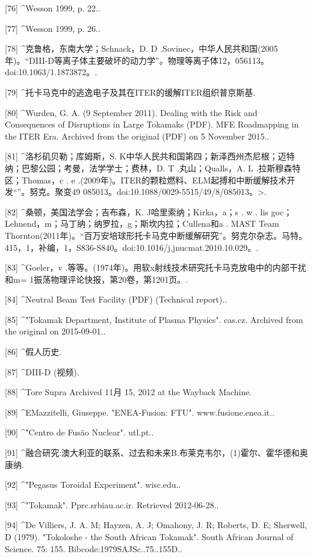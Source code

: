 [76]
^Wesson 1999, p. 22..

[77]
^Wesson 1999, p. 26..

[78]
^克鲁格，东南大学；Schnack，D. D .Sovinec，中华人民共和国(2005年)。“DIII-D等离子体主要破坏的动力学”。物理等离子体12，056113。doi:10.1063/1.1873872。.

[79]
^托卡马克中的逃逸电子及其在ITER的缓解ITER组织普京斯基.

[80]
^Wurden, G. A. (9 September 2011). Dealing with the Risk and Consequences of Disruptions in Large Tokamaks (PDF). MFE Roadmapping in the ITER Era. Archived from the original (PDF) on 5 November 2015..

[81]
^洛杉矶贝勒；库姆斯，S. K中华人民共和国第四；新泽西州杰尼根；迈特纳；巴黎公园；考曼，法学学士；费林，D. T .丸山；Qualls，A. L .拉斯穆森特区；Thomas，c . e .(2009年)。ITER的颗粒燃料、ELM起搏和中断缓解技术开发“”。努克。聚变49 085013。doi:10.1088/0029-5515/49/8/085013。>.

[82]
^桑顿，美国法学会；吉布森，K. J哈里索纳；Kirka，a；s . w . lis goc；Lehnend，m；马丁纳；纳罗拉，g；斯坎内拉；Cullena和a . MAST Team Thornton(2011年)。“百万安培球形托卡马克中断缓解研究”。努克尔杂志。马特。415，1，补编，1，S836-S840。doi:10.1016/j.jnucmat.2010.10.029。.

[83]
^Goeler，v .等等。(1974年)。用软x射线技术研究托卡马克放电中的内部干扰和m= 1振荡物理评论快报，第20卷，第1201页。.

[84]
^Neutral Beam Test Facility (PDF) (Technical report)..

[85]
^"Tokamak Department, Institute of Plasma Physics". cas.cz. Archived from the original on 2015-09-01..

[86]
^假人历史.

[87]
^DIII-D (视频).

[88]
^Tore Supra Archived 11月 15, 2012 at the Wayback Machine.

[89]
^EMazzitelli, Giuseppe. "ENEA-Fusion: FTU". www.fusione.enea.it..

[90]
^"Centro de Fusão Nuclear". utl.pt..

[91]
^融合研究:澳大利亚的联系、过去和未来B.布莱克韦尔，(1)霍尔、霍华德和奥康纳.

[92]
^"Pegasus Toroidal Experiment". wisc.edu..

[93]
^"Tokamak". Pprc.srbiau.ac.ir. Retrieved 2012-06-28..

[94]
^De Villiers, J. A. M; Hayzen, A. J; Omahony, J. R; Roberts, D. E; Sherwell, D (1979). "Tokoloshe - the South African Tokamak". South African Journal of Science. 75: 155. Bibcode:1979SAJSc..75..155D..

